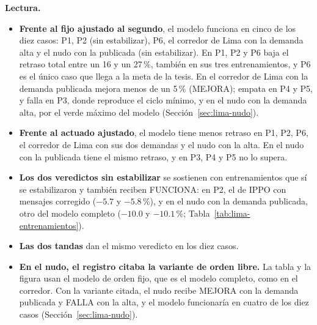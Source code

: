 \noindent\textbf{Lectura.}
\begin{itemize}
  \item \textbf{Frente al fijo ajustado al segundo}, el modelo funciona
    en cinco de los diez casos: P1, P2 (sin estabilizar), P6, el
    corredor de Lima con la demanda alta y el nudo con la publicada (sin
    estabilizar). En P1, P2 y P6 baja el retraso total entre un 16 y un
    27\,\%, también en sus tres entrenamientos, y P6 es el único caso que
    llega a la meta de la tesis. En el corredor de Lima con la demanda
    publicada mejora menos de un 5\,\% (MEJORA); empata en P4 y P5, y
    falla en P3, donde reproduce el ciclo mínimo, y en el nudo con la
    demanda alta, por el verde máximo del modelo
    (Sección~\ref{sec:lima-nudo}).
  \item \textbf{Frente al actuado ajustado}, el modelo tiene menos
    retraso en P1, P2, P6, el corredor de Lima con sus dos demandas y el
    nudo con la alta. En el nudo con la publicada tiene el mismo retraso,
    y en P3, P4 y P5 no lo supera.
  \item \textbf{Los dos veredictos sin estabilizar} se sostienen con
    entrenamientos que sí se estabilizaron y también reciben FUNCIONA:
    en P2, el de IPPO con mensajes corregido ($-5.7$ y $-5.8$\,\%), y en
    el nudo con la demanda publicada, otro del modelo completo ($-10.0$
    y $-10.1$\,\%; Tabla~\ref{tab:lima-entrenamientos}).
  \item \textbf{Las dos tandas} dan el mismo veredicto en los diez casos.
  \item \textbf{En el nudo, el registro citaba la variante de orden
    libre.} La tabla y la figura usan el modelo de orden fijo, que es el
    modelo completo, como en el corredor. Con la variante citada, el nudo
    recibe MEJORA con la demanda publicada y FALLA con la alta, y el
    modelo funcionaría en cuatro de los diez casos
    (Sección~\ref{sec:lima-nudo}).
\end{itemize}
